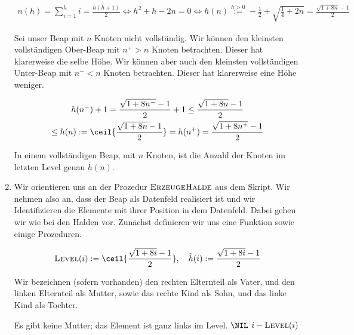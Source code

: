 \begin{solution}
\begin{enumerate}[label = \alph*]
  \begin{align*}
    n(h)
    =
    \sum_{i=1}^h i
    =
    \frac{h (h + 1)}{2}
    \iff
    h^2 + h - 2 n = 0
    \iff
    h(n)
    \stackrel{h > 0}{:=}
    -\frac{1}{2} + \sqrt{\frac{1}{4} + 2 n}
    =
    \frac{\sqrt{1 + 8 n} - 1}{2}
  \end{align*}

  Sei unser Beap mit $n$ Knoten nicht vollständig.
  Wir können den kleinsten vollständigen Ober-Beap mit $n^+ > n$ Knoten betrachten.
  Dieser hat klarerweise die selbe Höhe.
  Wir können aber auch den kleinsten vollständigen Unter-Beap mit $n^- < n$ Knoten betrachten.
  Dieser hat klarerweise eine Höhe weniger.

  \begin{multline*}
  h(n^-) + 1
  =
  \frac{\sqrt{1 + 8 n^-} - 1}{2} + 1
  \leq
  \frac{\sqrt{1 + 8 n} - 1}{2} \\
  \leq
  h(n)
  :=
  \ceil{\frac{\sqrt{1 + 8 n} - 1}{2}}
  =
  h(n^+)
  =
  \frac{\sqrt{1 + 8 n^+} - 1}{2}
  \end{multline*}

  In einem vollständigen Beap, mit $n$ Knoten, ist die Anzahl der Knoten im letzten Level genau $h(n)$.

  \item Wir orientieren uns an der Prozedur $\textsc{ErzeugeHalde}$ aus dem Skript.
  Wir nehmen also an, dass der Beap als Datenfeld realisiert ist und wir Identifizieren die Elemente mit ihrer Position in dem Datenfeld.
  Dabei gehen wir wie bei den Halden vor.
  Zunächst definieren wir uns eine Funktion sowie einige Prozeduren.

  \begin{align*}
    \textsc{Level}(i) := \ceil{\frac{\sqrt{1 + 8i} - 1}{2}},
    \quad
    \tilde h(i) := \frac{\sqrt{1 + 8 i} - 1}{2}
  \end{align*}

  Wir bezeichnen (sofern vorhanden) den rechten Elternteil als Vater, und den linken Elternteil als Mutter, sowie das rechte Kind als Sohn, und das linke Kind als Tochter.

  \phantom{}

  \begin{algorithmic}
      \Comment Es gibt keine Mutter; das Element ist ganz links im Level.
        \State \Return $\NIL$
      \Else
          \State \Return $i - \textsc{Level}(i)$
      \EndIf
    \EndProcedure
  \end{algorithmic}


\end{enumerate}
\end{solution}
